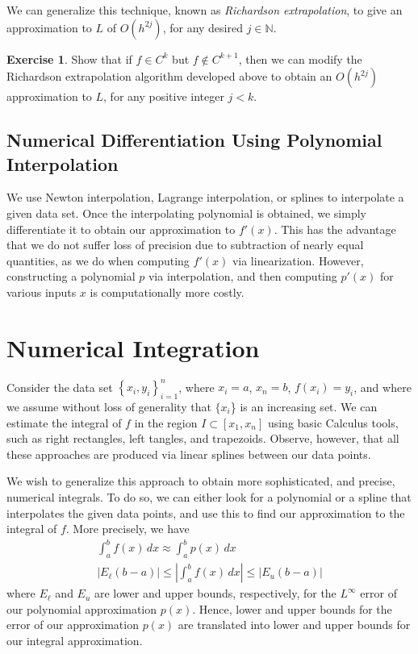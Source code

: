 \documentclass[12pt]{article}
\theoremstyle{plain}
\theoremstyle{definition}
\newtheorem*{exercise}{Exercise}
\theoremstyle{remark}
\numberwithin{equation}{section}  %
\begin{document}
		We can generalize this technique, known as \emph{Richardson extrapolation},
		to give an approximation to $L$ of
		$O(h^{2j})$, for any desired $j \in \mathbb{N}$. 
		\begin{exercise}
			Show that if $f \in C^k$ but $f \not \in C^{k+1}$, then we can modify
			the Richardson extrapolation algorithm developed above to obtain an 
			$O(h^{2j})$ approximation to $L$, for any positive integer $j < k$.
		\end{exercise}
		\subsection{Numerical Differentiation Using Polynomial Interpolation}
		We use Newton interpolation, Lagrange interpolation, or splines to interpolate a
		given data set. Once the interpolating polynomial is obtained, we simply differentiate it
		to obtain our approximation to $f'(x)$. This has the advantage
		that we do not suffer loss of precision due to subtraction of nearly equal
		quantities, as we do when computing $f'(x)$ via linearization. However,
		constructing a polynomial $p$ via interpolation, and then computing $p'(x)$
		for various inputs $x$ is computationally more costly. 
		\section{Numerical Integration}
		Consider the data set $ \left\{ x_i, y_i \right\}_{i=1}^{n}$, where $x_i = a$,
		$x_n = b$, $f(x_i) = y_i$,
		and where we assume without loss of generality that $\{x_i$\} is an
		increasing set. We can estimate the integral of $f$ in the region $I \subset [x_1, x_n]$
		using basic Calculus tools, such as right rectangles, left tangles, and trapezoids.
		Observe, however, that all these approaches are produced via linear splines
		between our data points. 

		We wish to generalize this approach to obtain more sophisticated, and precise,
		numerical integrals. To do so, we can either look for a polynomial or a spline
		that interpolates the given data points, and use this to find our approximation
		to the integral of $f$. More precisely, we have 
		\begin{align*}
			\int_a^b f(x)\, dx \approx \int_a^b p(x)\, dx
			\\
			|E_\ell(b-a)| \le | \int_a^b f(x) \, dx| \le |E_u (b-a)|
		\end{align*}
		where $E_\ell$ and $E_u$ are lower and upper bounds, respectively, for the $L^\infty$
		error of our polynomial approximation $p(x)$. Hence, lower and upper bounds for the error of our approximation $p(x)$
		are translated into lower and upper bounds for our integral approximation.
\end{document}
